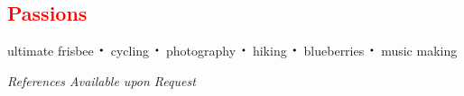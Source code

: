 \documentclass[margin, line, palatino, courier, 10pt]{res}
\newcommand*{\bigDot}{\raisebox{-0.25ex}{\scalebox{2.1}{$\cdot$}}}
\begin{document}
\begin{resume}
\section{\sc \textcolor{Red}{\large{Passions}}}
ultimate frisbee $\bigDot$ cycling $\bigDot$ photography $\bigDot$ hiking $\bigDot$ blueberries $\bigDot$ music making


\vspace{0.21 in}

\vspace{0.3 in}
\centerline{\emph{References Available upon Request}}


\end{resume}
\end{document}
